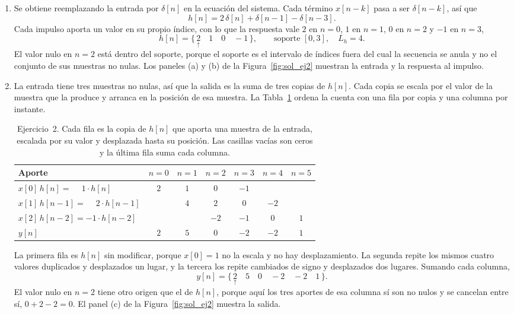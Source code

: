 \documentclass[10pt,a4paper]{article}
\begin{document}
	\begin{enumerate}
		\item Se obtiene reemplazando la entrada por
		$\delta[n]$ en la ecuación del sistema. Cada término $x[n-k]$ pasa a ser
		$\delta[n-k]$, así que
		\[
			h[n] = 2\,\delta[n] + \delta[n-1] - \delta[n-3].
		\]
		Cada impulso aporta un valor en su propio índice, con lo que la respuesta vale $2$
		en $n=0$, $1$ en $n=1$, $0$ en $n=2$ y $-1$ en $n=3$,
		\[
			\boxed{\;h[n] = \{\, \underset{\uparrow}{2} \quad 1 \quad 0 \quad -1 \,\},
			\qquad \text{soporte } [0,3],\quad L_h = 4.\;}
		\]
		El valor nulo en $n=2$ está dentro del soporte, porque el soporte es el intervalo de
		índices fuera del cual la secuencia se anula y no el conjunto de sus muestras no
		nulas. Los paneles (a) y (b) de la Figura~\ref{fig:sol_ej2} muestran la entrada y la
		respuesta al impulso.

		\item La entrada tiene tres muestras no
		nulas, así que la salida es la suma de tres copias de $h[n]$. Cada copia se escala
		por el valor de la muestra que la produce y arranca en la posición de esa muestra.
		La Tabla~\ref{tab:sol_ej2} ordena la cuenta con una fila por copia y una columna por
		instante.

		\begin{table}[H]
			\centering
			\caption{Ejercicio~2. Cada fila es la copia de $h[n]$ que aporta una muestra de
			la entrada, escalada por su valor y desplazada hasta su posición. Las casillas
			vacías son ceros y la última fila suma cada columna.}
			\label{tab:sol_ej2}
			\renewcommand{\arraystretch}{1.3}
			\begin{tabular}{lcccccc}
				\toprule
				Aporte & $n=0$ & $n=1$ & $n=2$ & $n=3$ & $n=4$ & $n=5$ \\
				\midrule
				$x[0]\,h[n]   = \phantom{-}1\cdot h[n]$   & $2$ & $1$ & $0$  & $-1$ &      &     \\
				$x[1]\,h[n-1] = \phantom{-}2\cdot h[n-1]$ &     & $4$ & $2$  & $0$  & $-2$ &     \\
				$x[2]\,h[n-2] = -1\cdot h[n-2]$           &     &     & $-2$ & $-1$ & $0$  & $1$ \\
				\midrule
				$y[n]$ & $2$ & $5$ & $0$ & $-2$ & $-2$ & $1$ \\
				\bottomrule
			\end{tabular}
		\end{table}

		La primera fila es $h[n]$ sin modificar, porque $x[0]=1$ no la escala y no hay
		desplazamiento. La segunda repite los mismos cuatro valores duplicados y desplazados
		un lugar, y la tercera los repite cambiados de signo y desplazados dos lugares.
		Sumando cada columna,
		\[
			\boxed{\;y[n] = \{\, \underset{\uparrow}{2} \quad 5 \quad 0 \quad -2 \quad -2 \quad 1 \,\}.\;}
		\]
		El valor nulo en $n=2$ tiene otro origen que el de $h[n]$, porque aquí los tres
		aportes de esa columna sí son no nulos y se cancelan entre sí, $0+2-2=0$. El panel
		(c) de la Figura~\ref{fig:sol_ej2} muestra la salida.


\end{enumerate}
\end{document}
